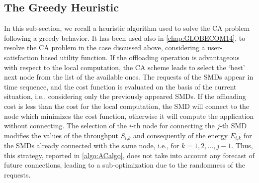 \documentclass[twoside,openright]{report}
\begin{document}
\subsection{The Greedy Heuristic}
\label{sub:greedy}
In this sub-section, we recall a heuristic algorithm used to solve the \gls{CA} problem following a greedy behavior. It has been used also in \autoref{chap:GLOBECOM14}, to resolve the \gls{CA} problem in the case discussed above, considering a user-satisfaction based utility function. 
If the offloading operation is advantageous with respect to the local computation, the \gls{CA} scheme leads to select the `best' next node from the list of the available ones. The requests of the \glspl{SMD} appear in time sequence, and the cost function is evaluated on the basis of the current situation, i.e., considering only the previously appeared \glspl{SMD}. 
If the offloading cost is less than the cost for the local computation, the \gls{SMD} will connect to the node which minimizes the cost function, otherwise it will compute the application without connecting.
The selection of the $i$-th node for connecting the $j$-th \gls{SMD} modifies the values of the throughput $S_\textit{i,k}$ and consequently of the energy $E_\textit{i,k}$ for the \glspl{SMD} already connected with the same node, i.e., for $k=1,2,\dots,j-1$. 
Thus, this strategy, reported in \autoref{algo:ACalgo}, does not take into account any forecast of future connections, leading to a sub-optimization due to the randomness of the requests.
\end{document}
